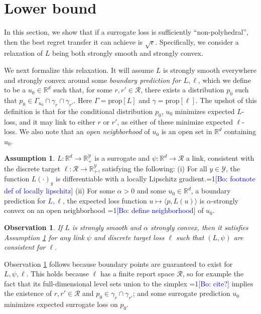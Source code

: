 \documentclass{article}
\newtheorem{observation}{Observation}
\theoremstyle{definition}\newtheorem{definition}{Definition}
\theoremstyle{definition}\newtheorem{assumption}{Assumption}
\newcommand{\Comments}{1}
\newcommand{\mynote}[2]{\ifnum\Comments=1\textcolor{#1}{#2}\fi}
\newcommand{\bo}[1]{\mynote{blue}{[Bo: #1]}}
\newcommand{\reals}{\mathbb{R}}
\newcommand{\prop}[1]{\mathrm{prop}[#1]}
\newcommand{\R}{\mathcal{R}}
\newcommand{\Y}{\mathcal{Y}}
\newcommand{\inprod}[2]{\langle #1, #2 \rangle}%
\begin{document}
\section{Lower bound}

In this section, we show that if a surrogate loss is sufficiently ``non-polyhedral'', then the best regret transfer it can achieve is $\sqrt{\epsilon}$.
Specifically, we consider a relaxation of $L$ being both strongly smooth and strongly convex.

We next formalize this relaxation.
It will assume $L$ is strongly smooth everywhere and strongly convex around some \emph{boundary prediction for $L,\ell$}, which we define to be a $u_0 \in \reals^d$ such that, for some $r,r' \in \R$, there exists a distribution $p_0$ such that $p_0 \in \Gamma_{u_0} \cap \gamma_r \cap \gamma_{r'}$.
Here $\Gamma = \prop{L}$ and $\gamma = \prop{\ell}$.
The upshot of this definition is that for the conditional distribution $p_0$, $u_0$ minimizes expected $L$-loss, and it may link to either $r$ or $r'$, as either of these minimize expected $\ell$-loss.
We also note that an \emph{open neighborhood} of $u_0$ is an open set in $\reals^d$ containing $u_0$.

\begin{assumption} \label{assumption:lower}
  $L: \reals^d \to \reals^{\Y}_+$ is a surrogate and $\psi: \reals^d \to \R$ a link, consistent with the discrete target $\ell: \R \to \reals^{\Y}_+$, satisfying the following: (i) For all $y \in \Y$, the function $L(\cdot)_y$ is differentiable with a locally Lipschitz gradient.\bo{footnote def of locally lipschitz} (ii) For some $\alpha > 0$ and some $u_0 \in \reals^d$, a boundary prediction for $L,\ell$, the expected loss function $u \mapsto \inprod{p}{L(u)}$ is $\alpha$-strongly convex on an open neighborhood \bo{define neighborhood} of $u_0$.
\end{assumption}

\begin{observation} \label{obs:lower-implied}
  If $L$ is strongly smooth and $\alpha$ strongly convex, then it satisfies Assumption \ref{assumption:lower} for any link $\psi$ and discrete target loss $\ell$ such that $(L,\psi)$ are consistent for $\ell$.
\end{observation}
Observation \ref{obs:lower-implied} follows because boundary points are guaranteed to exist for $L,\psi,\ell$.
This holds because $\ell$ has a finite report space $\R$, so for example the fact that its full-dimensional level sets union to the simplex \bo{cite?} implies the existence of $r,r' \in \R$ and $p_0 \in \gamma_r \cap \gamma_{r'}$; and some surrogate prediction $u_0$ minimizes expected surrogate loss on $p_0$.
\end{document}

